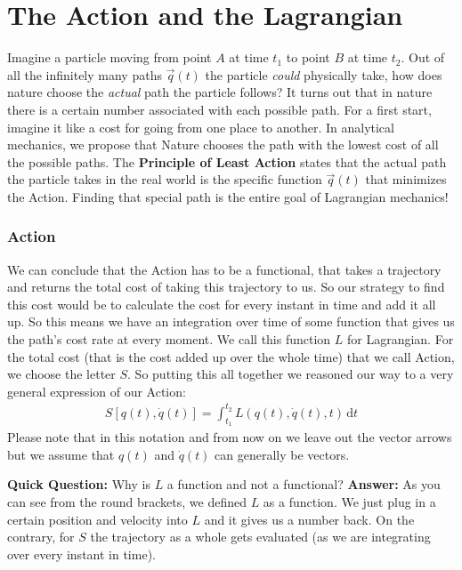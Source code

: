 \documentclass{article}
\begin{document}
	\section{The Action and the Lagrangian}
	Imagine a particle moving from point $A$ at time $t_1$ to point $B$ at time $t_2$. Out of all the infinitely many paths $\vec{q}(t)$ the particle \textit{could} physically take, how does nature choose the \textit{actual} path the particle follows?
	It turns out that in nature there is a certain number associated with each possible path. For a first start, imagine it like a cost for going from one place to another. In analytical mechanics, we propose that Nature chooses the path with the lowest cost of all the possible paths.
	The \textbf{Principle of Least Action} states that the actual path the particle takes in the real world is the specific function $\vec{q}(t)$ that minimizes the Action. Finding that special path is the entire goal of Lagrangian mechanics!
	
	\subsubsection*{Action}
	We can conclude that the Action has to be a functional, that takes a trajectory and returns the total cost of taking this trajectory to us.
	So our strategy to find this cost would be to calculate the cost for every instant in time and add it all up. So this means we have an integration over time of some function that gives us the path's cost rate at every moment. We call this function $L$ for Lagrangian. For the total cost (that is the cost added up over the whole time) that we call Action, we choose the letter $S$. So putting this all together we reasoned our way to a very general expression of our Action: 
	\begin{align} \label{eq:action}
		S[q(t), \dot{q}(t)]=\int_{t_1}^{t_2} L(q(t), \dot{q}(t), t)\,\text{d}t
	\end{align}
	Please note that in this notation and from now on we leave out the vector arrows but we assume that $q(t)$ and $\dot{q}(t)$ can generally be vectors.
	
	\textbf{Quick Question:} Why is $L$ a function and not a functional? \textbf{Answer:} As you can see from the round brackets, we defined $L$ as a function. We just plug in a certain position and velocity into $L$ and it gives us a number back. On the contrary, for $S$ the trajectory as a whole gets evaluated (as we are integrating over every instant in time).
	
\end{document}
